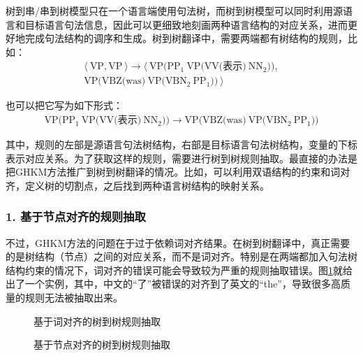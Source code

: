 \parinterval 树到串/串到树模型只在一个语言端使用句法树，而树到树模型可以同时利用源语言和目标语言句法信息，因此可以更细致地刻画两种语言结构的对应关系，进而更好地完成句法结构的调序和生成。树到树翻译中，需要两端都有树结构的规则，比如：
\begin{eqnarray}
\langle\ \textrm{VP},\textrm{VP}\ \rangle \rightarrow \langle\ \textrm{VP(}\textrm{PP}_1\ \textrm{VP(VV(表示)}\ \textrm{NN}_2\textrm{))}, \nonumber \\
\textrm{VP(VBZ(was)}\ \textrm{VP(}\textrm{VBN}_2\ \textrm{PP}_1\textrm{))}\ \rangle \nonumber
\end{eqnarray}

\parinterval 也可以把它写为如下形式：
\begin{eqnarray}
\textrm{VP(}\textrm{PP}_1\ \textrm{VP(VV(表示)}\ \textrm{NN}_2\textrm{))} \rightarrow \textrm{VP(VBZ(was)}\ \textrm{VP(}\textrm{VBN}_2\ \textrm{PP}_1\textrm{))} \nonumber
\end{eqnarray}

\noindent 其中，规则的左部是源语言句法树结构，右部是目标语言句法树结构，变量的下标表示对应关系。为了获取这样的规则，需要进行树到树规则抽取。最直接的办法是把GHKM方法推广到树到树翻译的情况。比如，可以利用双语结构的约束和词对齐，定义树的切割点，之后找到两种语言树结构的映射关系。


\subsubsection{1. 基于节点对齐的规则抽取}

\parinterval 不过，GHKM方法的问题在于过于依赖词对齐结果。在树到树翻译中，真正需要的是树结构（节点）之间的对应关系，而不是词对齐。特别是在两端都加入句法树结构约束的情况下，词对齐的错误可能会导致较为严重的规则抽取错误。图\ref{fig:8-34}就给出了一个实例，其中，中文的“了”被错误的对齐到了英文的“the”，导致很多高质量的规则无法被抽取出来。
\vspace{-0.5em}
\begin{figure}[htp]
\centering

\caption{基于词对齐的树到树规则抽取}
\label{fig:8-34}
\end{figure}
\vspace{-2em}
\begin{figure}[htb]
\centering

\caption{基于节点对齐的树到树规则抽取}
\label{fig:8-35}
\end{figure}

